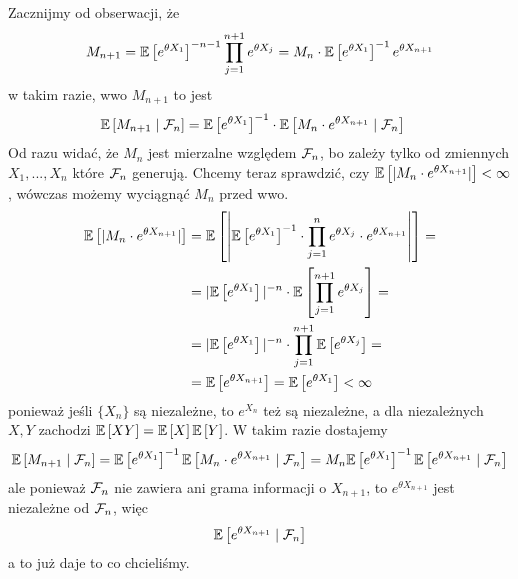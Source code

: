 \begin{solution}
  Zacznijmy od obserwacji, że
  $$M_{n+1}=\expected{e^{\theta X_1}}^{-n-1}\prod_{j=1}^{n+1}e^{\theta X_j}=M_n\cdot\expected{e^{\theta X_1}}^{-1}e^{\theta X_{n+1}}$$
  w takim razie, wwo $M_{n+1}$ to jest
  \begin{align*}
    \expected{M_{n+1}}{\set{F}_n}&=\expected{e^{\theta X_1}}^{-1}\cdot \expected{M_n\cdot e^{\theta X_{n+1}}}{\set{F}_n}
  \end{align*}
  Od razu widać, że $M_n$ jest mierzalne względem $\mathcal{F}_n$, bo zależy tylko od zmiennych $X_1,...,X_n$ które $\mathcal{F}_n$ generują. Chcemy teraz sprawdzić, czy $\expected{|M_n\cdot e^{\theta X_{n+1}}|}<\infty$, wówczas możemy wyciągnąć $M_n$ przed wwo.
  \begin{align*}
    \expected{|M_n\cdot e^{\theta X_{n+1}}|}&=\expected{\left |\expected{e^{\theta X_1}}^{-1}\cdot \prod_{j=1}^{n} e^{\theta X_j}\cdot e^{\theta X_{n+1}} \right| }=\\ 
                                            &=|\expected{e^{\theta X_1}}|^{-n}\cdot\expected{ \prod_{j=1}^{n+1}e^{\theta X_j} }=\\ 
                                            &=|\expected{e^{\theta X_1}}|^{-n}\cdot \prod_{j=1}^{n+1}\expected{e^{\theta X_j}}=\\ 
                                            &=\expected{e^{\theta X_{n+1}}}=\expected{e^{\theta X_1}}<\infty
  \end{align*}
  ponieważ jeśli $\{X_n\}$ są niezależne, to $e^{X_n}$ też są niezależne, a dla niezależnych $X,Y$ zachodzi $\expected{XY}=\expected{X}\expected{Y}$.
  W takim razie dostajemy
  $$\expected{M_{n+1}}{\set{F}_n}=\expected{e^{\theta X_1}}^{-1}\expected{M_n\cdot e^{\theta X_{n+1}}}{\set{F}_n}=M_n\expected{e^{\theta X_1}}^{-1}\expected{e^{\theta X_{n+1}}}{\set{F}_{n}}$$
  ale ponieważ $\mathcal{F}_n$ nie zawiera ani grama informacji o $X_{n+1}$, to $e^{\theta X_{n+1}}$ jest niezależne od $\mathcal{F}_n$, więc
  $$\expected{e^{\theta X_{n+1}}}{\set{F}_n}$$
    a to już daje to co chcieliśmy.
\end{solution}

